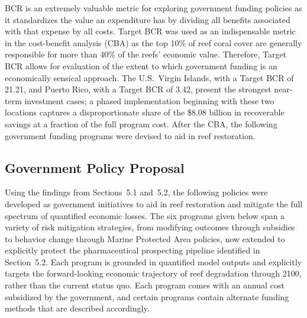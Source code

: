 \documentclass[10pt,letterpaper]{article}
\newcounter{metric}
\newcounter{gs}
\begin{document}
BCR is an extremely valuable metric for exploring government funding policies as it standardizes the
value an expenditure has by dividing all benefits associated with that expense by all costs. Target
BCR was used as an indispensable metric in the cost-benefit analysis (CBA) as the top 10\% of reef
coral cover are generally responsible for more than 40\% of the reefs' economic value. Therefore,
Target BCR allows for evaluation of the extent to which government funding is an economically
sensical approach. The U.S.\ Virgin Islands, with a Target BCR of 21.21, and Puerto Rico, with a
Target BCR of 3.42, present the strongest near-term investment cases; a phased implementation
beginning with these two locations captures a disproportionate share of the \$8.08 billion in
recoverable savings at a fraction of the full program cost. After the CBA, the following government
funding programs were devised to aid in reef restoration.


\subsection{Government Policy Proposal}

Using the findings from Sections~5.1 and~5.2, the following policies were developed as government
initiatives to aid in reef restoration and mitigate the full spectrum of quantified economic losses.
The six programs given below span a variety of risk mitigation strategies, from modifying outcomes
through subsidies to behavior change through Marine Protected Area policies, now extended to
explicitly protect the pharmaceutical prospecting pipeline identified in Section~5.2. Each program
is grounded in quantified model outputs and explicitly targets the forward-looking economic
trajectory of reef degradation through 2100, rather than the current status quo. Each program comes
with an annual cost subsidized by the government, and certain programs contain alternate funding
methods that are described accordingly.
\end{document}
